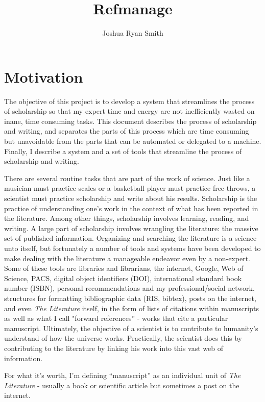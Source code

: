 \documentclass[letterpaper,12pt]{article}
\title{Refmanage}
\author{Joshua Ryan Smith}
\begin{document}
\maketitle




\section{Motivation}
The objective of this project is to develop a system that streamlines the process of scholarship so that my expert time and energy are not inefficiently wasted on inane, time consuming tasks. This document describes the process of scholarship and writing, and separates the parts of this process which are time consuming but unavoidable from the parts that can be automated or delegated to a machine. Finally, I describe a system and a set of tools that streamline the process of scholarship and writing. 

There are several routine tasks that are part of the work of science. Just like a musician must practice scales or a basketball player must practice free-throws, a scientist must practice scholarship and write about his results. Scholarship is the practice of understanding one's work in the context of what has been reported in the literature. Among other things, scholarship involves learning, reading, and writing. A large part of scholarship involves wrangling the literature: the massive set of published information. Organizing and searching the literature is a science unto itself, but fortunately a number of tools and systems have been developed to make dealing with the literature a manageable endeavor even by a non-expert. Some of these tools are libraries and librarians, the internet, Google, Web of Science, PACS, digital object identifiers (DOI), international standard book number (ISBN), personal recommendations and my professional/social network, structures for formatting bibliographic data (RIS, bibtex), posts on the internet, and even \emph{The Literature} itself, in the form of lists of citations within manuscripts as well as what I call "forward references'' - works that cite a particular manuscript. Ultimately, the objective of a scientist is to contribute to humanity's understand of how the universe works. Practically, the scientist does this by contributing to the literature by linking his work into this vast web of information.

For what it's worth, I'm defining ``manuscript'' as an individual unit of \emph{The Literature}  - usually a book or scientific article but sometimes a post on the internet.
\end{document}
